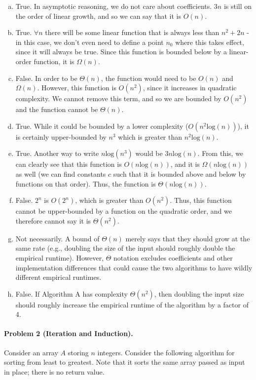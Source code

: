 \documentclass[11pt]{article}
\begin{document}
\begin{enumerate}[(a)]
	\item True. In asymptotic reasoning, we do not care about coefficients. $3n$ is still on the order of linear growth, and so we can say that it is $O(n)$.
	\item True. $\forall n$ there will be some linear function that is always less than $n^2 + 2n$ - in this case, we don't even need to define a point $n_0$ where this takes effect, since it will always be true. Since this function is bounded below by a linear-order function, it is $\Omega(n)$.
	\item False. In order to be $\Theta(n)$, the function would need to be $O(n)$ and $\Omega(n)$. However, this function is $O(n^2)$, since it increases in quadratic complexity. We cannot remove this term, and so we are bounded by $O(n^2)$ and the function cannot be $\Theta(n)$.
	\item True. While it could be bounded by a lower complexity ($O(n^2\text{log}(n))$), it is certainly upper-bounded by $n^3$ which is greater than $n^2\text{log}(n)$.
    \item True. Another way to write $n\text{log}(n^3)$ would be $3n\text{log}(n)$. From this, we can clearly see that this function is $O(n\text{log}(n))$, and it is $\Omega(n\text{log}(n))$ as well (we can find constants $c$ such that it is bounded above and below by functions on that order). Thus, the function is $\Theta(n\text{log}(n))$.
	\item False. $2^n$ is $O(2^n)$, which is greater than $O(n^2)$. Thus, this function cannot be upper-bounded by a function on the quadratic order, and we therefore cannot say it is $\Theta(n^2)$.
	\item Not necessarily. A bound of $\Theta(n)$ merely says that they should grow at the same rate (e.g., doubling the size of the input should roughly double the empirical runtime). However, $\Theta$ notation excludes coefficients and other implementation differences that could cause the two algorithms to have wildly different empirical runtimes.
	\item False. If Algorithm A has complexity $\Theta(n^2)$, then doubling the input size should roughly increase the empirical runtime of the algorithm by a factor of 4.
\end{enumerate}


\newpage
\paragraph{Problem 2 (Iteration and Induction).}
Consider an array $A$ storing $n$ integers. Consider the following algorithm for sorting from least to greatest. Note that it sorts the same array passed as input in place; there is no return value.
\end{document}
